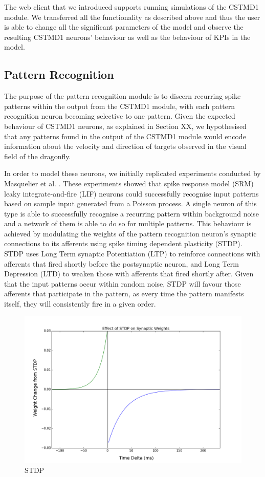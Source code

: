 \documentclass[a4paper,11pt]{article}
\begin{document}
The web client that we introduced supports running simulations of the CSTMD1 module. We transferred all the functionality as described above and thus the user is able to change all the significant parameters of the model and observe the resulting CSTMD1 neurons' behaviour as well as the behaviour of KPIs in the model.

\subsection{Pattern Recognition}

The purpose of the pattern recognition module is to discern recurring spike patterns within the output from the CSTMD1 module, with each pattern recognition neuron becoming selective to one pattern. Given the expected behaviour of CSTMD1 neurons, as explained in Section XX, we hypothesised that any patterns found in the output of the CSTMD1 module would encode information about the velocity and direction of targets observed in the visual field of the dragonfly.\par

	In order to model these neurons, we initially replicated experiments conducted by Masquelier et al. \cite{stdp2} \cite{stdp1}. These experiments showed that spike response model (SRM) leaky integrate-and-fire (LIF) neurons could successfully recognise input patterns based on sample input generated from a Poisson process. A single neuron of this type is able to successfully recognise a recurring pattern within background noise and a network of them is able to do so for multiple patterns. This behaviour is achieved by modulating the weights of the pattern recognition neuron's synaptic connections to its afferents using spike timing dependent plasticity (STDP). STDP uses Long Term synaptic Potentiation (LTP) to reinforce connections with afferents that fired shortly before the postsynaptic neuron, and Long Term Depression (LTD) to weaken those with afferents that fired shortly after. Given that the input patterns occur within random noise, STDP will favour those afferents that participate in the pattern, as every time the pattern manifests itself, they will consistently fire in a given order.
	
\begin{figure}[H]
\centering
\includegraphics[scale = 0.35]{stdp}
\caption{STDP}
\end{figure}
\end{document}

